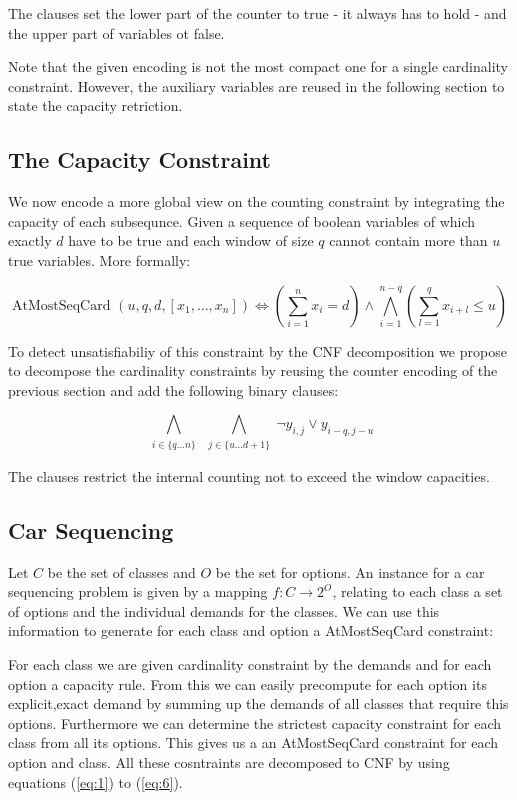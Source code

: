 \documentclass[]{llncs}
\newcommand{\AtMostSeqCard}{AtMostSeqCard }
\begin{document}
The clauses set the lower part of the counter to true - it always has to hold -  and the upper part of variables ot
false. 

Note that the given encoding is not the most compact one for a single cardinality constraint.  However, the auxiliary
variables are reused in the following section to state the capacity retriction. 

\subsection{The Capacity Constraint}

We now encode a more global view on the counting constraint by integrating the capacity of each subsequnce. Given a
sequence of boolean variables of which exactly $d$ have to be true and each window of size $q$ cannot contain more than
$u$ true variables. More formally: 

$$ \text{\AtMostSeqCard}(u,q,d,[x_{1},\ldots,x_{n}]) \iff (\sum_{i=1}^n x_{i} = d) \wedge
\bigwedge_{i=1}^{n-q}(\sum_{l=1}^q x_{i+l} \leq u )$$

To detect unsatisfiabiliy of this constraint by the CNF decomposition we propose to decompose the cardinality
constraints by reusing the counter encoding of the previous section and add the following binary clauses:

\begin{equation} \label{eq:6}
    \bigwedge_{\substack{i \in \{q \ldots n\}}}
    \bigwedge_{\substack{j\in\{u\ldots d+1\}}}
    \neg y_{i,j} \vee y_{i-q,j-u}
\end{equation}               

The clauses restrict the internal counting not to exceed the window capacities.

\subsection{Car Sequencing}

Let $C$ be the set of classes and $O$ be the set for options. An instance for a car sequencing problem is given by a
mapping $f : C\rightarrow 2^O$, relating to each class a set of options and the individual demands for the classes. We
can use this information to generate for each class and option a \AtMostSeqCard constraint:

For each class we are given cardinality constraint by the demands and for each option a capacity rule. From this we can
easily precompute for each option its explicit,exact demand by summing up the demands of all classes that require this
options.  Furthermore we can determine the strictest capacity constraint for each class from all its options. This gives
us a an \AtMostSeqCard constraint for each option and class. All these cosntraints are decomposed to CNF by using
equations (\ref{eq:1}) to (\ref{eq:6}).
\end{document}

